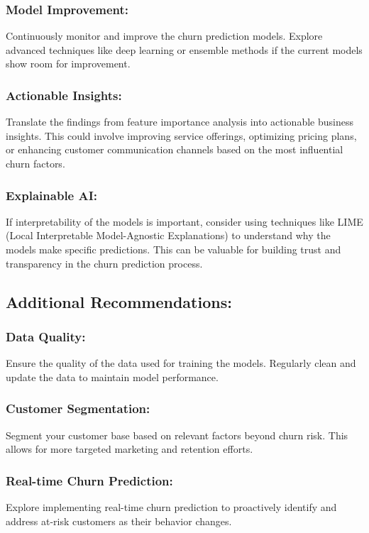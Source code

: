     \subsubsection{Model Improvement:} Continuously monitor and improve the churn prediction models. Explore advanced techniques like deep learning or ensemble methods if the current models show room for improvement.
    \subsubsection{Actionable Insights:} Translate the findings from feature importance analysis into actionable business insights. This could involve improving service offerings, optimizing pricing plans, or enhancing customer communication channels based on the most influential churn factors.
    \subsubsection{Explainable AI:} If interpretability of the models is important, consider using techniques like LIME (Local Interpretable Model-Agnostic Explanations) to understand why the models make specific predictions. This can be valuable for building trust and transparency in the churn prediction process.

\subsection{Additional Recommendations:}

    \subsubsection{Data Quality:} Ensure the quality of the data used for training the models. Regularly clean and update the data to maintain model performance.
    \subsubsection{Customer Segmentation:} Segment your customer base based on relevant factors beyond churn risk. This allows for more targeted marketing and retention efforts.
    \subsubsection{Real-time Churn Prediction:} Explore implementing real-time churn prediction to proactively identify and address at-risk customers as their behavior changes.
